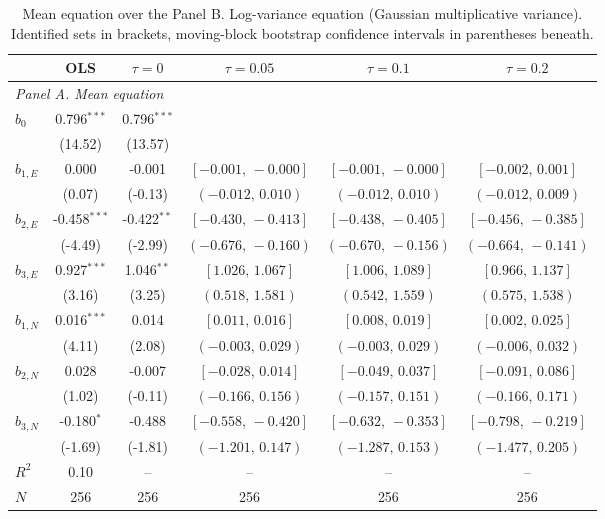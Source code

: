 \begin{table}[!htbp]
\centering
\begin{threeparttable}
\caption{Mean equation over the Panel B. Log-variance equation (Gaussian multiplicative variance). Identified sets in brackets, moving-block bootstrap confidence intervals in parentheses beneath.}
\label{tab:log_var_eq_panel_harvey}
\scriptsize\setlength{\tabcolsep}{3pt}
\begin{tabular}{lccccc}
\toprule
 & OLS & $\tau{=}0$ & $\tau{=}0.05$ & $\tau{=}0.1$ & $\tau{=}0.2$ \\
\midrule
\multicolumn{6}{l}{\textit{Panel A. Mean equation}} \\
\midrule
$b_0$ & 0.796$^{***}$ & 0.796$^{***}$ &  &  &  \\
 & (14.52) & (13.57) &  &  &  \\
$b_{1,E}$ & 0.000 & -0.001 & $[-0.001,\,-0.000]$ & $[-0.001,\,-0.000]$ & $[-0.002,\,0.001]$ \\
 & (0.07) & (-0.13) & $(-0.012,\,0.010)$ & $(-0.012,\,0.010)$ & $(-0.012,\,0.009)$ \\
$b_{2,E}$ & -0.458$^{***}$ & -0.422$^{**}$ & $[-0.430,\,-0.413]$ & $[-0.438,\,-0.405]$ & $[-0.456,\,-0.385]$ \\
 & (-4.49) & (-2.99) & $(-0.676,\,-0.160)$ & $(-0.670,\,-0.156)$ & $(-0.664,\,-0.141)$ \\
$b_{3,E}$ & 0.927$^{***}$ & 1.046$^{**}$ & $[1.026,\,1.067]$ & $[1.006,\,1.089]$ & $[0.966,\,1.137]$ \\
 & (3.16) & (3.25) & $(0.518,\,1.581)$ & $(0.542,\,1.559)$ & $(0.575,\,1.538)$ \\
\midrule
$b_{1,N}$ & 0.016$^{***}$ & 0.014 & $[0.011,\,0.016]$ & $[0.008,\,0.019]$ & $[0.002,\,0.025]$ \\
 & (4.11) & (2.08) & $(-0.003,\,0.029)$ & $(-0.003,\,0.029)$ & $(-0.006,\,0.032)$ \\
$b_{2,N}$ & 0.028 & -0.007 & $[-0.028,\,0.014]$ & $[-0.049,\,0.037]$ & $[-0.091,\,0.086]$ \\
 & (1.02) & (-0.11) & $(-0.166,\,0.156)$ & $(-0.157,\,0.151)$ & $(-0.166,\,0.171)$ \\
$b_{3,N}$ & -0.180$^{*}$ & -0.488 & $[-0.558,\,-0.420]$ & $[-0.632,\,-0.353]$ & $[-0.798,\,-0.219]$ \\
 & (-1.69) & (-1.81) & $(-1.201,\,0.147)$ & $(-1.287,\,0.153)$ & $(-1.477,\,0.205)$ \\
\midrule
$R^2$ & 0.10 & -- & -- & -- & -- \\
$N$ & 256 & 256 & 256 & 256 & 256 \\

\end{tabular}
\end{threeparttable}
\end{table}
